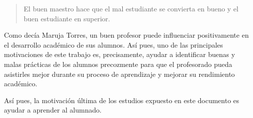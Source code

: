 \begin{quote}
\small El buen maestro hace que el mal estudiante se convierta en bueno y el buen estudiante en superior.

\end{quote}

Como decía Maruja Torres, un buen profesor puede influenciar positivamente en el desarrollo académico de sus alumnos. Así pues, uno de las principales motivaciones de este trabajo es, precisamente, ayudar a identificar buenas y malas prácticas de los alumnos precozmente para que el profesorado pueda asistirles mejor durante su proceso de aprendizaje y mejorar su rendimiento académico.

Así pues, la motivación última de los estudios expuesto en este documento es ayudar a aprender al alumnado.
